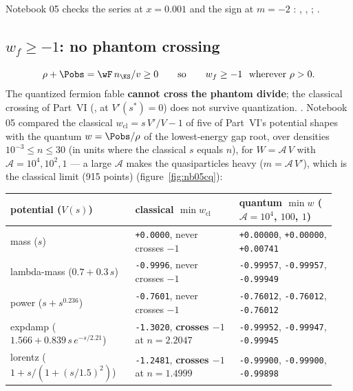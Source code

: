 Notebook 05 checks the series at $x=0.001$ and the sign at $m=-2$ :
, ,
; .

\subsection{\texorpdfstring{$w_f\geq-1$}{w\_f >= -1}: no phantom crossing}
\label{sec:7.9}

\[
  \rho+\Pobs=\wF\,n_{\KS}/v\geq0\qquad\text{so}\qquad w_f\geq-1\ \text{ wherever } \rho>0 .
\]
The quantized fermion fable \textbf{cannot cross the phantom divide}; the classical crossing of Part~VI
(, at $V'(s^*)=0$) does not survive quantization. 
. Notebook 05 compared the classical $w_{\mathrm{cl}}=s\,V'/V-1$ of five of
Part~VI's potential shapes with the quantum $w=\Pobs/\rho$ of the lowest-energy gap root, over densities
$10^{-3}\leq n\leq30$ (in units where the classical $s$ equals $n$), for $W=\mathcal A\,V$ with
$\mathcal A=10^4,10^2,1$ --- a large $\mathcal A$ makes the quasiparticles heavy ($m=\mathcal A\,V'$), which
is the classical limit (915 points) 
(figure~\ref{fig:nb05cq}):
\begin{center}
\small
\renewcommand{\arraystretch}{1.3}
\begin{tabular}{@{}>{\raggedright\arraybackslash}p{0.36\linewidth}>{\raggedright\arraybackslash}p{0.3\linewidth}>{\raggedright\arraybackslash}p{0.28\linewidth}@{}}
\toprule
potential ($V(s)$) & classical $\min w_{\mathrm{cl}}$ & quantum $\min w$ ($\mathcal A=10^4$, $100$, $1$)\\
\midrule
mass ($s$) & \texttt{+0.0000}, never crosses $-1$ & \texttt{+0.00000}, \texttt{+0.00000}, \texttt{+0.00741}\\
lambda-mass ($0.7+0.3\,s$) & \texttt{-0.9996}, never crosses $-1$ & \texttt{-0.99957}, \texttt{-0.99957}, \texttt{-0.99949}\\
power ($s+s^{0.236}$) & \texttt{-0.7601}, never crosses $-1$ & \texttt{-0.76012}, \texttt{-0.76012}, \texttt{-0.76012}\\
expdamp ($1.566+0.839\,s\,e^{-s/2.21}$) & \texttt{-1.3020}, \textbf{crosses $-1$} at $n=2.2047$ & \texttt{-0.99952}, \texttt{-0.99947}, \texttt{-0.99945}\\
lorentz ($1+s/(1+(s/1.5)^2)$) & \texttt{-1.2481}, \textbf{crosses $-1$} at $n=1.4999$ & \texttt{-0.99900}, \texttt{-0.99900}, \texttt{-0.99898}\\
\bottomrule
\end{tabular}
\end{center}
